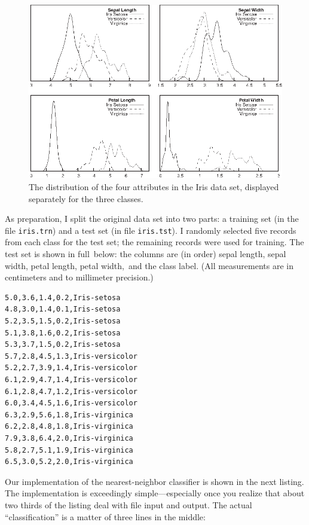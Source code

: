 \begin{figure}
\centerline{\includegraphics{img/predhistos}}
  \caption{The distribution of the four attributes in the Iris data
    set, displayed separately for the three classes.}
  \label{fig:predhistos}
\end{figure}

As preparation, I split the original data set into two parts: a
training set (in the file \texttt{iris.trn}) and a test set (in file
\texttt{iris.tst}). I randomly  selected five records from each class
for the test set; the remaining records were used for training.  The
test set is shown in full~below: the columns are  (in order) sepal
length, sepal width, petal length, petal width,~and the class label.
(All measurements are in centimeters and to millimeter precision.)\vspace*{13pt}

\begin{verbatim}
5.0,3.6,1.4,0.2,Iris-setosa
4.8,3.0,1.4,0.1,Iris-setosa
5.2,3.5,1.5,0.2,Iris-setosa
5.1,3.8,1.6,0.2,Iris-setosa
5.3,3.7,1.5,0.2,Iris-setosa
5.7,2.8,4.5,1.3,Iris-versicolor
5.2,2.7,3.9,1.4,Iris-versicolor
6.1,2.9,4.7,1.4,Iris-versicolor
6.1,2.8,4.7,1.2,Iris-versicolor
6.0,3.4,4.5,1.6,Iris-versicolor
6.3,2.9,5.6,1.8,Iris-virginica
6.2,2.8,4.8,1.8,Iris-virginica
7.9,3.8,6.4,2.0,Iris-virginica
5.8,2.7,5.1,1.9,Iris-virginica
6.5,3.0,5.2,2.0,Iris-virginica
\end{verbatim}\vspace*{3pt}

Our implementation of the nearest-neighbor classifier is shown in the
next listing. The implementation is exceedingly simple---especially
once you realize that about two thirds of the listing deal with file
input and output. The\vadjust{\pagebreak} actual ``classification'' is a matter of three
lines in the middle:

